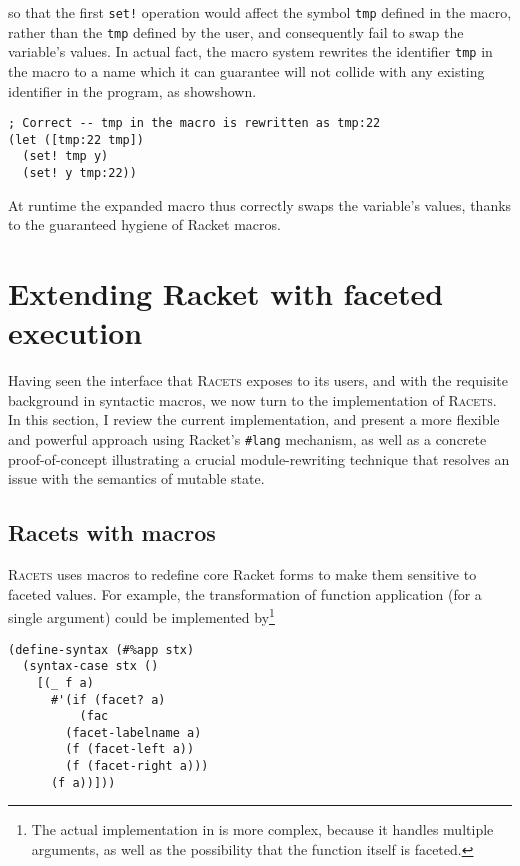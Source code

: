 \documentclass{article}
\begin{document}
\noindent so that the first \texttt{set!} operation would affect the symbol \texttt{tmp} defined in the macro, rather than the \texttt{tmp} defined by the user, and consequently fail to swap the variable's values. In actual fact, the macro system rewrites the identifier \texttt{tmp} in the macro to a name which it can guarantee will not collide with any existing identifier in the program, as showshown.

\begin{lstlisting}
; Correct -- tmp in the macro is rewritten as tmp:22
(let ([tmp:22 tmp])
  (set! tmp y)
  (set! y tmp:22))
\end{lstlisting}

At runtime the expanded macro thus correctly swaps the variable's values, thanks to the guaranteed hygiene of Racket macros.



\section{Extending Racket with faceted execution\label{sec:lang}}
Having seen the interface that \textsc{Racets} exposes to its users, and with the requisite background in syntactic macros, we now turn to the implementation of \textsc{Racets}. In this section, I review the current implementation, and present a more flexible and powerful approach using Racket's \texttt{\#lang} mechanism, as well as a concrete proof-of-concept illustrating a crucial module-rewriting technique that resolves an issue with the semantics of mutable state.


\subsection{Racets with macros}
\textsc{Racets} uses macros to redefine core Racket forms to make them sensitive to faceted values. For example, the transformation of function application (for a single argument) could be implemented by\footnote{The actual implementation in \cite{racets} is more complex, because it handles multiple arguments, as well as the possibility that the function itself is faceted.}

\begin{lstlisting}
(define-syntax (#%app stx)
  (syntax-case stx ()
    [(_ f a)
      #'(if (facet? a)
          (fac
	    (facet-labelname a)
	    (f (facet-left a))
	    (f (facet-right a)))
	  (f a))]))
\end{lstlisting}
\end{document}
